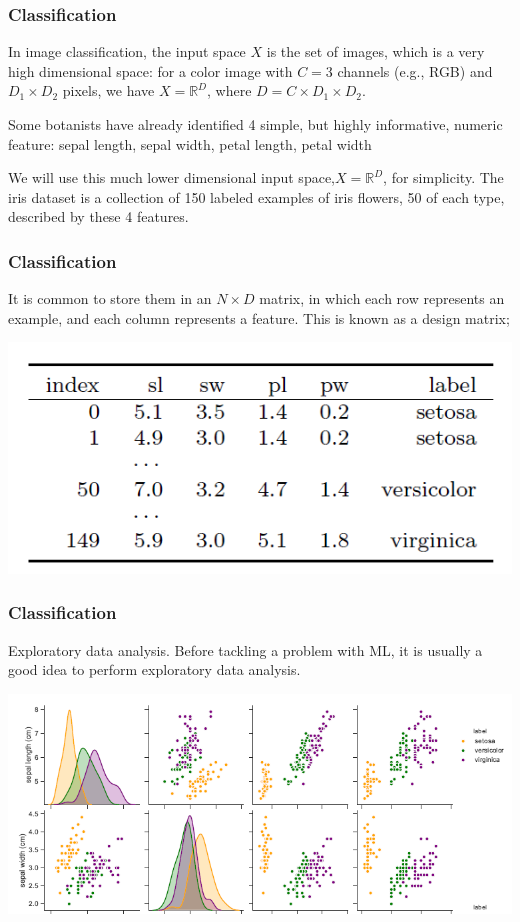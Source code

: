 \documentclass[spanish]{beamer}
\begin{document}
\begin{frame}
\frametitle{Classification}  
In image classification, the input space $X$ is the set of images, which is a very high dimensional
space: for a color image with $C = 3$ channels (e.g., RGB) and $D_1 \times  D_2$ pixels, we have $X = \mathbb{R}^{D}$, where $D= C \times D_1 \times D_2$.

Some botanists have already identified 4 simple, but highly informative, numeric
feature: sepal length, sepal width, petal length, petal width

We will use this much lower dimensional input space,$X = \mathbb{R}^{D}$, for simplicity. The iris dataset is a collection of 150 labeled examples of iris flowers, 50 of
each type, described by these 4 features.
\end{frame}
\begin{frame}
\frametitle{Classification}  
It is common to store them in an $N\times D$ matrix, in which each row represents an example, and each column represents a feature. This is known as a design
matrix;
\begin{center}
\includegraphics[width=\textwidth]{im3}
\end{center}

\end{frame}
\begin{frame}
\frametitle{Classification}  
Exploratory data analysis. Before tackling a problem with ML, it is usually a good idea to perform exploratory data analysis.

\begin{center}
\includegraphics[width=\textwidth]{im4}
\end{center}

\end{frame}
\end{document}

